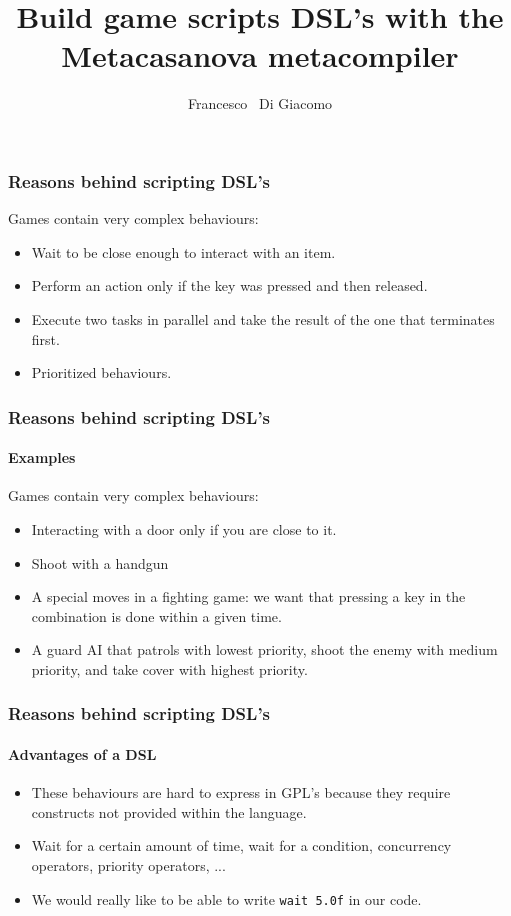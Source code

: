 \documentclass[10pt,a4paper]{beamer}
\begin{document}
\author[Di Giacomo]
{Francesco ~Di Giacomo}
\date{}
\title{Build game scripts DSL's with the Metacasanova metacompiler}

\frame{\titlepage}

\begin{frame}
\frametitle{Reasons behind scripting DSL's}
Games contain very complex behaviours:
\begin{itemize}
\item Wait to be close enough to interact with an item.
\item Perform an action only if the key was pressed and then released.
\item Execute two tasks in parallel and take the result of the one that terminates first.
\item Prioritized behaviours.
\end{itemize}
\end{frame}

\begin{frame}
	\frametitle{Reasons behind scripting DSL's}
	\framesubtitle{Examples}
	Games contain very complex behaviours:
	\begin{itemize}
		\item Interacting with a door only if you are close to it.
		\item Shoot with a handgun
		\item A special moves in a fighting game: we want that pressing a key in the combination is done within a given time.
		\item A guard AI that patrols with lowest priority, shoot the enemy with medium priority, and take cover with highest priority.
	\end{itemize}
\end{frame}

\begin{frame}
	\frametitle{Reasons behind scripting DSL's}
	\framesubtitle{Advantages of a DSL}
	\begin{itemize}
		\item These behaviours are hard to express in GPL's because they require constructs not provided within the language.
		\item Wait for a certain amount of time, wait for a condition, concurrency operators, priority operators, ...
		\item We would really like to be able to write \texttt{wait 5.0f} in our code.
	\end{itemize}
\end{frame}
\end{document}
